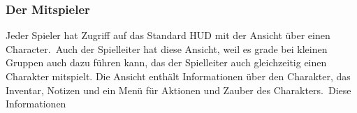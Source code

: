 \subsubsection{Der Mitspieler}
Jeder Spieler hat Zugriff auf das Standard HUD mit der Ansicht über einen Character.\ Auch der Spielleiter hat diese
Ansicht, weil es grade bei kleinen Gruppen auch dazu führen kann, das der Spielleiter auch gleichzeitig einen Charakter
mitspielt.
Die Ansicht enthält Informationen über den Charakter, das Inventar, Notizen und ein Menü für Aktionen und Zauber des
Charakters.\ Diese Informationen
\newblock